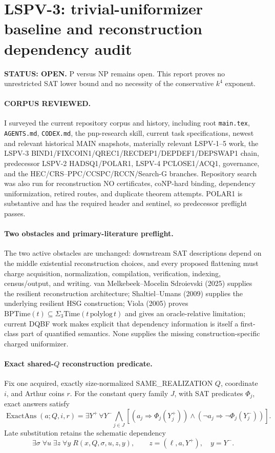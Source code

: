 \documentclass[11pt]{article}
\begin{document}
\section*{LSPV-3: trivial-uniformizer baseline and reconstruction dependency audit}
\textbf{STATUS: OPEN.} P versus NP remains open. This report proves no unrestricted SAT lower bound and no necessity of the conservative $k^4$ exponent.

\paragraph{CORPUS REVIEWED.}
I surveyed the current repository corpus and history, including root \texttt{main.tex}, \texttt{AGENTS.md}, \texttt{CODEX.md}, the pnp-research skill, current task specifications, newest and relevant historical MAIN snapshots, materially relevant LSPV-1--5 work, the LSPV-3 BIND1/FIXCOIN1/QREC1/RECDEP1/DEPDEF1/DEPSWAP1 chain, predecessor LSPV-2 HADSQ1/POLAR1, LSPV-4 PCLOSE1/ACQ1, governance, and the HEC/CRS--PPC/CCSPC/RCCN/Search-G branches. Repository search was also run for reconstruction NO certificates, coNP-hard binding, dependency uniformization, retired routes, and duplicate theorem attempts. POLAR1 is substantive and has the required header and sentinel, so predecessor preflight passes.

\paragraph{Two obstacles and primary-literature preflight.}
The two active obstacles are unchanged: downstream SAT descriptions depend on the middle existential reconstruction choices, and every proposed flattening must charge acquisition, normalization, compilation, verification, indexing, census/output, and writing. van Melkebeek--Mocelin Sdroievski (2025) supplies the resilient reconstruction architecture; Shaltiel--Umans (2009) supplies the underlying resilient HSG construction; Viola (2005) proves $\mathrm{BPTime}(t)\subseteq\Sigma_3\mathrm{Time}(t\,\mathrm{polylog}\,t)$ and gives an oracle-relative limitation; current DQBF work makes explicit that dependency information is itself a first-class part of quantified semantics. None supplies the missing construction-specific charged uniformizer.

\paragraph{Exact shared-$Q$ reconstruction predicate.}
Fix one acquired, exactly size-normalized SAME\_REALIZATION $Q$, coordinate $i$, and Arthur coins $r$. For the constant query family $J$, with SAT predicates $\Phi_j$, exact answers satisfy
\[
\operatorname{ExactAns}(a;Q,i,r)=\exists Y^+\,\forall Y^-\bigwedge_{j\in J}\left[(a_j\Rightarrow\Phi_j(Y_j^+))\wedge(\neg a_j\Rightarrow\neg\Phi_j(Y_j^-))\right].
\]
Late substitution retains the schematic dependency
\[
\boxed{\exists\sigma\;\forall u\;\exists z\;\forall y\;R(x,Q,\sigma,u,z,y)},\qquad z=(\ell,a,Y^+),\quad y=Y^-.
\]
\end{document}
